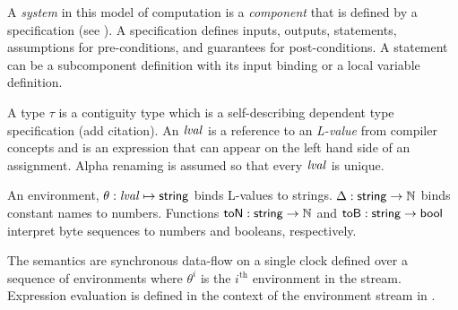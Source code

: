 A \emph{system} in this model of computation is a \emph{component} that is defined by a specification (see ). A specification defines inputs, outputs, statements, assumptions for pre-conditions, and guarantees for post-conditions. A statement can be a subcomponent definition with its input binding or a local variable definition.

A type $\tau$ is a contiguity type which is a self-describing dependent type specification (add citation). An $\mathit{lval}$ is a reference to an \emph{L-value} from compiler concepts and is an expression that can appear on the left hand side of an assignment. Alpha renaming is assumed so that every $\mathit{lval}$ is unique.

An environment, $\theta: \mathit{lval} \mapsto \mathsf{string}$ binds L-values to strings. $\Delta : \mathsf{string} \to \mathbb{N}$ binds constant names to numbers. Functions $\mathsf{toN}:\mathsf{string}\to\mathbb{N}$ and $\mathsf{toB}:\mathsf{string}\to\mathsf{bool}$ interpret byte sequences to numbers and booleans, respectively. 

The semantics are synchronous data-flow on a single clock defined over a sequence of environments where $\theta^i$ is the $i^\mathrm{th}$ environment in the stream. Expression evaluation is defined in the context of the environment stream in .

